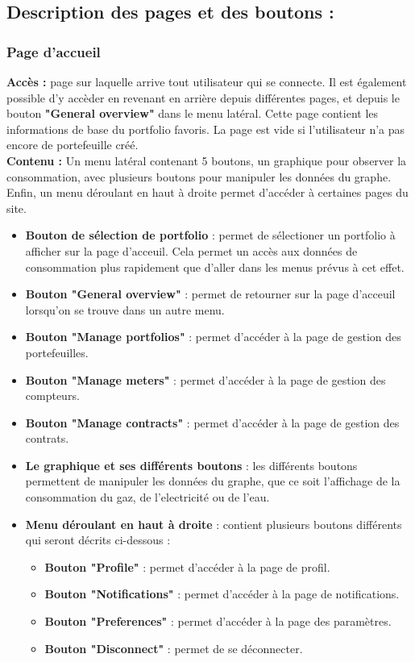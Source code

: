 \documentclass[../rapport.tex]{subfiles}
\begin{document}
\subsection{Description des pages et des boutons :} 

\subsubsection{Page d'accueil} 
\noindent \textbf{Accès :} page sur laquelle arrive tout utilisateur qui se connecte. Il est également possible d'y accèder en revenant en arrière depuis différentes pages, et depuis le bouton \textbf{"General overview"} dans le menu latéral. Cette page contient les informations de base du portfolio favoris. La page est vide si l'utilisateur n'a pas encore de portefeuille créé.  \\
\textbf{Contenu :} Un menu latéral contenant 5 boutons, un graphique pour observer la consommation, avec plusieurs boutons pour manipuler les données du graphe. Enfin, un menu déroulant en haut à droite permet d'accéder à certaines pages du site. \\
\begin{itemize}
    \item \textbf{Bouton de sélection de portfolio} : permet de sélectioner un portfolio à afficher sur la page d'acceuil. Cela permet un accès aux données de consommation plus rapidement que d'aller dans les menus prévus à cet effet.
    \item \textbf{Bouton "General overview"} : permet de retourner sur la page d'acceuil lorsqu'on se trouve dans un autre menu. 
    \item \textbf{Bouton "Manage portfolios"} : permet d'accéder à la page de gestion des portefeuilles.
    \item \textbf{Bouton "Manage meters"} : permet d'accéder à la page de gestion des compteurs. 
    \item \textbf{Bouton "Manage contracts"} : permet d'accéder à la page de gestion des contrats.
    \item \textbf{Le graphique et ses différents boutons} : les différents boutons permettent de manipuler les données du graphe, que ce soit l'affichage de la consommation du gaz, de l'electricité ou de l'eau. 
    \item \textbf{Menu déroulant en haut à droite} : contient plusieurs boutons différents qui seront décrits ci-dessous :
        \begin{itemize}
            \item \textbf{Bouton "Profile"} : permet d'accéder à la page de profil. 
            \item \textbf{Bouton "Notifications"} : permet d'accéder à la page de notifications.
            \item \textbf{Bouton "Preferences"} : permet d'accéder à la page des paramètres. 
            \item \textbf{Bouton "Disconnect"} : permet de se déconnecter.
        \end{itemize}
\end{itemize}
\end{document}
